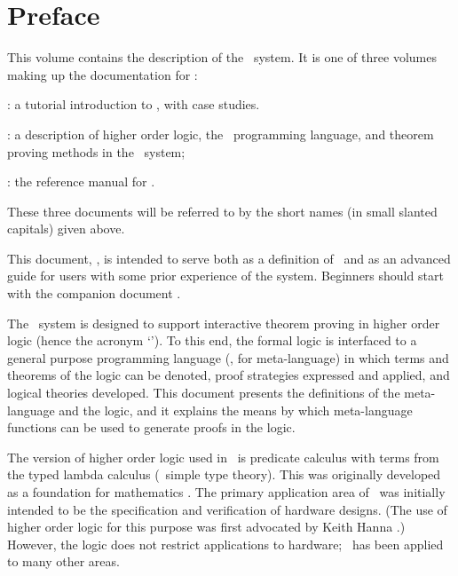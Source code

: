 \chapter*{Preface}
\label{intro}

This volume contains the  description of  the \HOL\  system.   
It is one of three volumes making up the documentation for \HOL:

\begin{myenumerate}
\item \TUTORIAL: a tutorial introduction to \HOL, with case studies.
\item \DESCRIPTION: a description of higher order logic,
the \ML\ programming language, and theorem proving methods in the \HOL\ system;
\item \REFERENCE: the reference manual for \HOL.
\end{myenumerate}

\noindent These three documents will be referred to by the short names (in
small slanted capitals) given above.

This document, \DESCRIPTION, is intended to serve both as a definition of \HOL\
and as an advanced guide for users with some prior experience of the system.
Beginners should start with the companion document \TUTORIAL.

The \HOL\ system is designed to support interactive theorem proving in higher
order logic (hence the acronym `\HOL').  To this end, the formal logic is
interfaced to a general purpose programming language (\ML, for meta-language)
in which terms and theorems of the logic can be denoted, proof strategies
expressed and applied, and logical theories developed.  This document presents
the definitions of the meta-language and the logic, and it explains the means
by which meta-language functions can be used to generate proofs in the logic.

The version of higher order logic used in \HOL\ is predicate calculus with
terms from the typed lambda calculus (\ie\ simple type theory). This was
originally developed as a foundation for mathematics \cite{Church}.  The
primary application area of \HOL\ was initially intended to be the
specification and verification of hardware designs.  (The use of higher order
logic for this purpose was first advocated by Keith Hanna \cite{Hanna-Daeche}.)
However, the logic does not restrict applications to hardware; \HOL\ has been
applied to many other areas.

